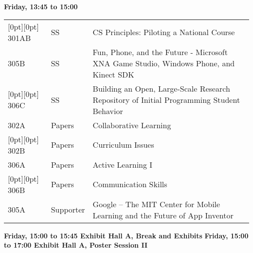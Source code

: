 \noindent
{\sffamily\bfseries Friday, 13:45 to 15:00}\newline\noindent
\begin{tabular*}{5in}{@{}p{0.5in}@{}p{0.75in}@{}p{3.75in}}

\rowcolor[gray]{0.9}[0pt][0pt] 301AB & SS & CS Principles:  Piloting a National Course \\

305B & SS & Fun, Phone, and the Future - Microsoft XNA Game Studio, Windows Phone, and Kinect SDK \\

\rowcolor[gray]{0.9}[0pt][0pt] 306C & SS & Building an Open, Large-Scale Research Repository of Initial Programming Student Behavior \\

302A & Papers & Collaborative Learning \\

\rowcolor[gray]{0.9}[0pt][0pt] 302B & Papers & Curriculum Issues \\

306A & Papers & Active Learning I \\

\rowcolor[gray]{0.9}[0pt][0pt] 306B & Papers & Communication Skills \\

305A & Supporter & Google -- The MIT Center for Mobile Learning and the Future of App Inventor 
\end{tabular*}
{\sffamily\bfseries Friday, 15:00 to 15:45 Exhibit Hall A, Break and Exhibits}\newline\noindent
{\sffamily\bfseries Friday, 15:00 to 17:00 Exhibit Hall A, Poster Session II}\newline\noindent



